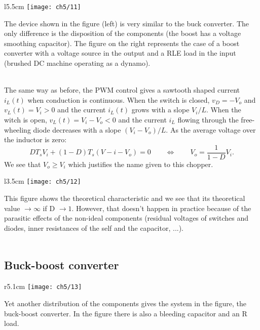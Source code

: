 		\begin{wrapfigure}[7]{l}{5.5cm}
		\vspace{-5mm}
		\texttt{[image: ch5/11]}
		\end{wrapfigure}	
		The device shown in the figure (left) is very similar to the buck converter. The only difference is the disposition of the components (the boost has a voltage smoothing capacitor). The figure on the right represents the case of a boost converter with a voltage source in the output and a RLE load in the input (brushed DC machine operating as a dynamo). 
		
		\ \\ The same way as before, the PWM control gives a sawtooth shaped current $i_L(t)$ when conduction is continuous. When the switch is closed, $v_D = -V_o$ and $v_L(t) = V_i >0$ and the current $i_L(t)$ grows with a slope $V_i/L$. When the witch is open, $v_L(t) = V_i - V_o < 0$ and the current $i_L$ flowing through the free-wheeling diode decreases with a slope $(V_i - V_o) /L$. As the average voltage over the inductor is zero:
		\begin{equation}
			DT_s V_i + (1-D)T_s (V-i-V_o) = 0 \qquad \Leftrightarrow \qquad V_o = \frac{1}{1-D}V_i. 
		\end{equation}
		We see that $V_o \geq V_i$ which justifies the name given to this chopper. 
		
		\begin{wrapfigure}[5]{l}{3.5cm}
		\vspace{-5mm}
		\texttt{[image: ch5/12]}
		\end{wrapfigure}
		This figure shows the theoretical characteristic and we see that its theoretical value $\rightarrow \infty$ if D $\rightarrow 1$. However, that doesn't happen in practice because of the parasitic effects of the non-ideal components (residual voltages of switches and diodes, inner resistances of the self and the capacitor, ...).   \\\\
		
	\subsection{Buck-boost converter}
		\begin{wrapfigure}[3]{r}{5.1cm}
		\vspace{-16mm}
		\texttt{[image: ch5/13]}
		\end{wrapfigure}
		Yet another distribution of the components gives the system in the figure, the buck-boost converter. In the figure there is also a bleeding capacitor and an R load. 
		
